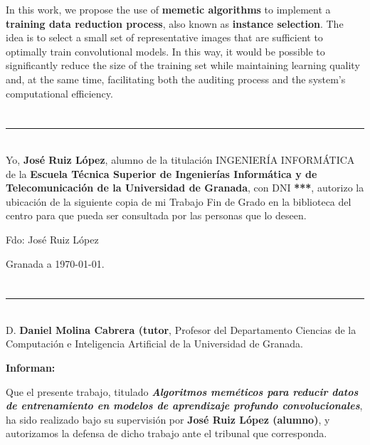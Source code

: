 In this work, we propose the use of \textbf{memetic algorithms} to implement a \textbf{training data reduction process},
also known as \textbf{instance selection}.
The idea is to select a small set of representative images that are sufficient to optimally train convolutional models.
In this way, it would be possible to significantly reduce the size of the training set while maintaining learning quality and,
at the same time, facilitating both the auditing process and the system's computational efficiency.

\chapter*{}
\thispagestyle{empty}

\noindent\rule[-1ex]{\textwidth}{2pt}\\[4.5ex]

Yo, \textbf{José Ruiz López}, alumno de la titulación INGENIERÍA INFORMÁTICA de la \textbf{Escuela Técnica Superior
       de Ingenierías Informática y de Telecomunicación de la Universidad de Granada}, con DNI \textbf{***}, autorizo la
ubicación de la siguiente copia de mi Trabajo Fin de Grado en la biblioteca del centro para que pueda ser
consultada por las personas que lo deseen.

\vspace{6cm}

\noindent Fdo: José Ruiz López

\vspace{2cm}

\begin{flushright}
       Granada a \today.
\end{flushright}


\chapter*{}
\thispagestyle{empty}

\noindent\rule[-1ex]{\textwidth}{2pt}\\[4.5ex]

D. \textbf{Daniel Molina Cabrera (tutor}, Profesor del Departamento Ciencias de la Computación e Inteligencia
Artificial de la Universidad de Granada.

\vspace{0.5cm}

\textbf{Informan:}

\vspace{0.5cm}

Que el presente trabajo, titulado \textit{\textbf{Algoritmos meméticos para reducir datos de entrenamiento en modelos de aprendizaje profundo convolucionales}},
ha sido realizado bajo su supervisión por \textbf{José Ruiz López (alumno)}, y autorizamos la defensa de dicho trabajo  ante el tribunal que corresponda.

